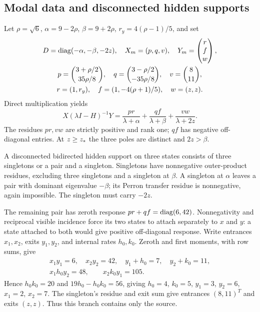 \subsection{Modal data and disconnected hidden supports}
Let $\rho=\sqrt6$, $\alpha=9-2\rho$, $\beta=9+2\rho$, $r_y=4(\rho-1)/5$, and set
\begin{gather}
 D=\operatorname{diag}(-\alpha,-\beta,-2z),\quad X_m=(p,q,v),\quad
 Y_m=\begin{pmatrix}r\\f\\w\end{pmatrix},\label{eq:modal}\\
 p=\binom{3+\rho/2}{35\rho/8},\quad
 q=\binom{3-\rho/2}{-35\rho/8},\quad v=\binom8{11},\\
 r=(1,r_y),\quad f=(1,-4(\rho+1)/5),\quad w=(z,z).
\end{gather}
Direct multiplication yields
\begin{equation}
 X(\lambda I-H)^{-1}Y
 =\frac{pr}{\lambda+\alpha}+\frac{qf}{\lambda+\beta}+\frac{vw}{\lambda+2z}.\label{eq:residues}
\end{equation}
The residues $pr,vw$ are strictly positive and rank one; $qf$ has negative off-diagonal entries. At $z\ge z_*$ the three poles are distinct and $2z>\beta$.

A disconnected bidirected hidden support on three states consists of three singletons or a pair and a singleton. Singletons have nonnegative outer-product residues, excluding three singletons and a singleton at $\beta$. A singleton at $\alpha$ leaves a pair with dominant eigenvalue $-\beta$; its Perron transfer residue is nonnegative, again impossible. The singleton must carry $-2z$.

The remaining pair has zeroth response $pr+qf=\operatorname{diag}(6,42)$. Nonnegativity and reciprocal visible incidence force its two states to attach separately to $x$ and $y$: a state attached to both would give positive off-diagonal response. Write entrances $x_1,x_2$, exits $y_1,y_2$, and internal rates $h_0,k_0$. Zeroth and first moments, with row sums, give
\begin{gather}
 x_1y_1=6,\quad x_2y_2=42,\quad y_1+h_0=7,\quad y_2+k_0=11,\\
 x_1h_0y_2=48,\qquad x_2k_0y_1=105.
\end{gather}
Hence $h_0k_0=20$ and $19h_0-h_0k_0=56$, giving $h_0=4$, $k_0=5$, $y_1=3$, $y_2=6$, $x_1=2$, $x_2=7$. The singleton's residue and exit sum give entrances $(8,11)^T$ and exits $(z,z)$. Thus this branch contains only the source.

